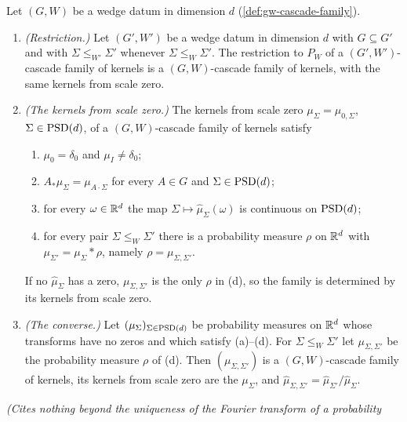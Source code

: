 \begin{lemma}
\label{lem:gw-kernels-from-origin}
\leanok
Let $(G, W)$ be a wedge datum in dimension $d$ (\ref{def:gw-cascade-family}).
\begin{enumerate}
\item \emph{(Restriction.)} Let $(G', W')$ be a wedge datum in dimension $d$ with $G \subseteq G'$ and
with $\Sigma \le_{W'} \Sigma'$ whenever $\Sigma \le_W \Sigma'$. The restriction to $P_W$ of a
$(G', W')$-cascade family of kernels is a $(G, W)$-cascade family of kernels, with the same kernels from scale zero.
\item \emph{(The kernels from scale zero.)} The kernels from scale zero $\mu_\Sigma = \mu_{0,\Sigma}$,
$\Sigma \in \mathrm{PSD}(d)$, of a $(G, W)$-cascade family of kernels satisfy
\begin{enumerate}
\item[(a)] $\mu_0 = \delta_0$ and $\mu_I \ne \delta_0$;
\item[(b)] $A_*\mu_\Sigma = \mu_{A\cdot\Sigma}$ for every $A \in G$ and $\Sigma \in \mathrm{PSD}(d)$;
\item[(c)] for every $\omega \in \mathbb{R}^d$ the map $\Sigma \mapsto \widehat\mu_\Sigma(\omega)$ is
continuous on $\mathrm{PSD}(d)$;
\item[(d)] for every pair $\Sigma \le_W \Sigma'$ there is a probability measure $\rho$ on $\mathbb{R}^d$ with
$\mu_{\Sigma'} = \mu_\Sigma * \rho$, namely $\rho = \mu_{\Sigma,\Sigma'}$.
\end{enumerate}
If no $\widehat\mu_\Sigma$ has a zero, $\mu_{\Sigma,\Sigma'}$ is the only $\rho$ in (d), so the family is
determined by its kernels from scale zero.
\item \emph{(The converse.)} Let $(\mu_\Sigma)_{\Sigma \in \mathrm{PSD}(d)}$ be probability measures on $\mathbb{R}^d$
whose transforms have no zeros and which satisfy (a)--(d). For $\Sigma \le_W \Sigma'$ let
$\mu_{\Sigma,\Sigma'}$ be the probability measure $\rho$ of (d). Then $(\mu_{\Sigma,\Sigma'})$ is a
$(G, W)$-cascade family of kernels, its kernels from scale zero are the $\mu_\Sigma$, and
$\widehat\mu_{\Sigma,\Sigma'} = \widehat\mu_{\Sigma'}/\widehat\mu_\Sigma$.
\end{enumerate}
\statusT\quad\emph{(Cites nothing beyond the uniqueness of the Fourier transform of a probability
}
\end{lemma}
